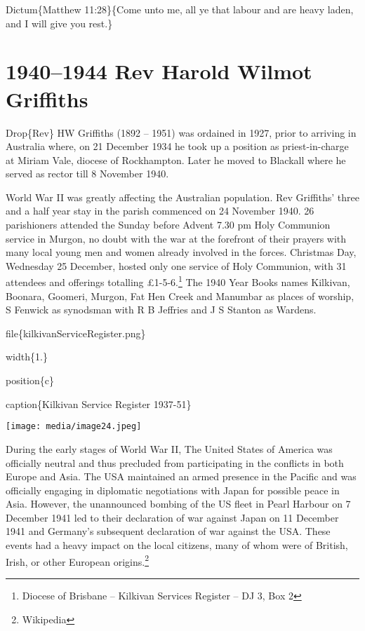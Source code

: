 Dictum\{Matthew 11:28\}\{Come unto me, all ye that labour and are heavy laden, and I will give you rest.\}

\hypertarget{rev-harold-wilmot-griffiths}{%
\chapter{1940--1944 Rev Harold Wilmot Griffiths}\label{rev-harold-wilmot-griffiths}}

Drop\{Rev\} HW Griffiths (1892 -- 1951) was ordained in 1927, prior to arriving in Australia where, on 21 December 1934 he took up a position as priest-in-charge at Miriam Vale, diocese of Rockhampton. Later he moved to Blackall where he served as rector till 8 November 1940.

World War II was greatly affecting the Australian population. Rev Griffiths' three and a half year stay in the parish commenced on 24 November 1940. 26 parishioners attended the Sunday before Advent 7.30 pm Holy Communion service in Murgon, no doubt with the war at the forefront of their prayers with many local young men and women already involved in the forces. Christmas Day, Wednesday 25 December, hosted only one service of Holy Communion, with 31 attendees and offerings totalling £1-5-6.\footnote{Diocese of Brisbane -- Kilkivan Services Register -- DJ 3, Box 2} The 1940 Year Books names Kilkivan, Boonara, Goomeri, Murgon, Fat Hen Creek and Manumbar as places of worship, S Fenwick as synodsman with R B Jeffries and J S Stanton as Wardens.

file\{kilkivanServiceRegister.png\}

width\{1.\}

position\{c\}

caption\{Kilkivan Service Register 1937-51\}

\texttt{[image: media/image24.jpeg]}

During the early stages of World War II, The United States of America was officially neutral and thus precluded from participating in the conflicts in both Europe and Asia. The USA maintained an armed presence in the Pacific and was officially engaging in diplomatic negotiations with Japan for possible peace in Asia. However, the unannounced bombing of the US fleet in Pearl Harbour on 7 December 1941 led to their declaration of war against Japan on 11 December 1941 and Germany's subsequent declaration of war against the USA. These events had a heavy impact on the local citizens, many of whom were of British, Irish, or other European origins.\footnote{Wikipedia}

